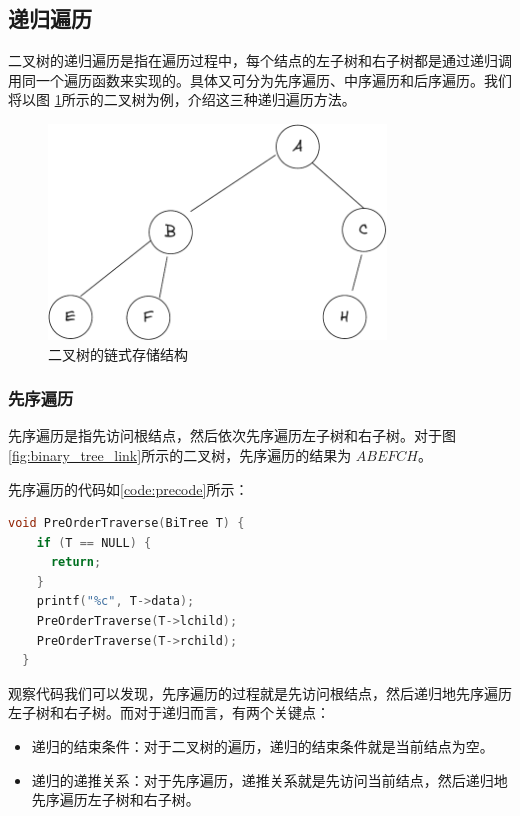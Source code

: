 \documentclass[lang=cn,newtx,10pt,scheme=chinese]{elegantbook}
\begin{document}
\subsection{递归遍历}

二叉树的递归遍历是指在遍历过程中，每个结点的左子树和右子树都是通过递归调用同一个遍历函数来实现的。具体又可分为先序遍历、中序遍历和后序遍历。我们将以图
\ref{fig:one_binary_tree_link}所示的二叉树为例，介绍这三种递归遍历方法。

\begin{figure}
  \centering
  \includegraphics[width=0.8\textwidth]{./figure/pdf/cropped/oneBTree.pdf}
  \caption{二叉树的链式存储结构}
  \label{fig:one_binary_tree_link}
\end{figure}

\subsubsection{先序遍历}

先序遍历是指先访问根结点，然后依次先序遍历左子树和右子树。对于图\ref{fig:binary_tree_link}所示的二叉树，先序遍历的结果为 $ABEFCH$。

先序遍历的代码如\ref{code:precode}所示：

\begin{lstlisting}[language=C++, caption={先序遍历}, label={code:precode}]
  void PreOrderTraverse(BiTree T) {
    if (T == NULL) {
      return;
    }
    printf("%c", T->data);
    PreOrderTraverse(T->lchild);
    PreOrderTraverse(T->rchild);
  }
\end{lstlisting}

观察代码我们可以发现，先序遍历的过程就是先访问根结点，然后递归地先序遍历左子树和右子树。而对于递归而言，有两个关键点：

\begin{itemize}
  \item 递归的结束条件：对于二叉树的遍历，递归的结束条件就是当前结点为空。
  \item 递归的递推关系：对于先序遍历，递推关系就是先访问当前结点，然后递归地先序遍历左子树和右子树。
  \end{itemize}
\end{document}
